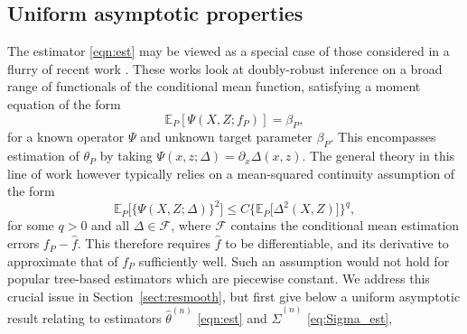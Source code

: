\documentclass[aos]{imsart}
\newcommand{\E}{\mathbb{E}}
\begin{document}
	
	\subsection{Uniform asymptotic properties}
	The estimator \eqref{eqn:est} may be viewed as a special case of those considered in 
	a flurry of recent work \citep{chernozhukov2020adversarial,  ChernozhukovAutoNet, ChernozhukovRobust, ChernozhukovRieszNet, ChernozhukovAutoDML, ChernozhukovRiesz,    ChernozhukovGeneral}. These works look at doubly-robust inference on a broad range of functionals of the conditional mean function, satisfying a moment equation of the form
	\begin{equation*}
				\E_P[\Psi(X,Z; f_P)] = \beta_P,
			\end{equation*}
		for a known operator $\Psi$ and unknown target parameter $\beta_P$. This encompasses estimation of $\theta_P$ by taking $\Psi(x,z;\Delta) = \partial_x \Delta(x,z)$.
		The general theory in this line of work however typically relies on a 
		 mean-squared continuity assumption of the form
		\begin{equation*}
				\E_P\big[\{\Psi(X,Z; \Delta)\}^2\big] \leq C\big\{\E_P\big[\Delta^2(X,Z)\big]\big\}^q,
			\end{equation*} 
		for some $q>0$ and all $\Delta\in \mathcal{F}$, where $\mathcal{F}$ contains the conditional mean estimation errors $f_P - \hat f$. This therefore requires $\hat{f}$ to be differentiable, and its derivative to approximate that of $f_P$ sufficiently well. Such an assumption would not hold for popular tree-based estimators which are piecewise constant.
We address this crucial issue in Section~\ref{sect:resmooth}, but first
		give below a uniform asymptotic result relating to estimators $\hat{\theta}^{(n)}$ \eqref{eqn:est} and $\hat{\Sigma}^{(n)}$ \eqref{eq:Sigma_est},
%		
\end{document}

